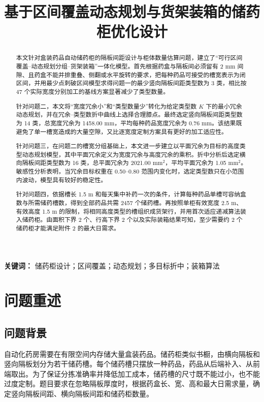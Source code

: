 \documentclass[UTF8,a4paper,12pt]{ctexart}
\title{基于区间覆盖动态规划与货架装箱的储药柜优化设计}
\author{}
\date{}
\begin{document}
\maketitle
\begin{abstract}
本文针对盒装药品自动储药柜的隔板间距设计与柜体数量估算问题，建立了“可行区间覆盖--动态规划分组--货架装箱”一体化模型。首先根据药盒与隔板间必须留有 2 mm 间隙、且药盒不能并排重叠、侧翻或水平旋转的要求，把每种药品可接受的槽宽表示为闭区间，并用最少点刺破区间模型求得问题一的最少竖向隔板间距类型数为 3 类，相比按 47 个实际宽度分别加工的基线方案显著减少了类型数量。

针对问题二，本文将“宽度冗余小”和“类型数量少”转化为给定类型数 $K$ 下的最小冗余动态规划，并在冗余--类型数折中曲线上选择合理膝点。最终选定竖向隔板间距类型数为 14 类，总宽度冗余为 1458.00 mm，平均每种药品宽度冗余为 0.76 mm。该结果既避免了单一槽宽造成的大量空隙，又比逐宽度定制方案具有更好的加工适应性。

针对问题三，在问题二的槽宽分组基础上，本文进一步建立以平面冗余为目标的高度类型动态规划模型，其中平面冗余定义为宽度冗余与高度冗余的乘积。折中分析后选定横向隔板间距类型数为 16 类，总平面冗余为 2021.00 mm$^2$，平均平面冗余为 1.05 mm$^2$。敏感性分析表明，当冗余目标权重在 0.50--0.80 范围内变化时，选定类型数只在小范围内波动，模型具有较好的稳定性。

针对问题四，依据槽长 1.5 m 和每天集中补药一次的条件，计算每种药品单槽可容纳盒数与所需储药槽数，得到全部药品共需 2457 个储药槽。再按照单柜有效宽度 2.5 m、有效高度 1.5 m 的限制，将相同高度类型的槽组织成货架行，并用首次适应递减算法装入储药柜。由面积下界 2 个、行高下界 2 个以及实际装箱结果可知，至少需要约 2 个储药柜才能满足附件 2 的最大日需求。
\end{abstract}
\textbf{关键词：} 储药柜设计；区间覆盖；动态规划；多目标折中；装箱算法
\newpage
\tableofcontents
\newpage

\section{问题重述}
\subsection{问题背景}
自动化药房需要在有限空间内存储大量盒装药品。储药柜类似书橱，由横向隔板和竖向隔板划分为若干储药槽。每个储药槽只摆放一种药品，药品从后端补入、从前端取出。为了保证分拣准确率并降低加工成本，储药槽的尺寸既不能过小，也不能过度定制。题目要求在忽略隔板厚度时，根据药盒长、宽、高和最大日需求量，确定竖向隔板间距、横向隔板间距和储药柜数量。
\end{document}
